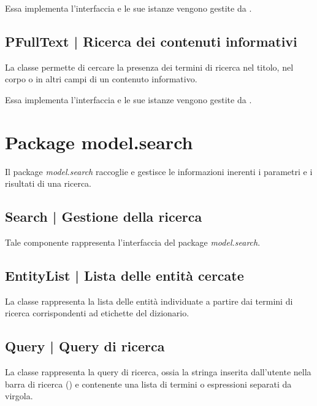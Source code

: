 \documentclass[10pt,a4paper,headinclude,footinclude,hidelinks]{scrreprt} %
\begin{document}
	Essa implementa l'interfaccia \textit{} e le sue istanze vengono gestite da \textit{}.

	\subsection[PFullText]{PFullText | Ricerca dei contenuti informativi}
	\label{sec:stage:design:sistema:model.search:full-text-provider}
	La classe \textit{} permette di cercare la presenza dei termini di ricerca nel titolo, nel corpo o in altri campi di un contenuto informativo.

	Essa implementa l'interfaccia \textit{} e le sue istanze vengono gestite da \textit{}.

	\section{Package model.search}
	\label{sec:stage:design:sistema:model.search}
	Il package \textit{model.search} raccoglie e gestisce le informazioni inerenti i parametri e i risultati di una ricerca. 

	\subsection[Search]{Search | Gestione della ricerca}
	\label{sec:stage:design:sistema:model.search:search}
	Tale componente rappresenta l'interfaccia del package \textit{model.search}.

	\subsection[EntityList]{EntityList | Lista delle entità cercate}
	\label{sec:stage:design:sistema:model.search:search-entity-list}
	La classe \textit{} rappresenta la lista delle entità individuate a partire dai termini di ricerca corrispondenti ad etichette del dizionario.

	\subsection[Query]{Query | Query di ricerca}
	\label{sec:stage:design:sistema:model.search:search-query}
	La classe \textit{} rappresenta la query di ricerca, ossia la stringa inserita dall'utente nella barra di ricerca (\textit{}) e contenente una lista di termini o espressioni separati da virgola.
\end{document}
